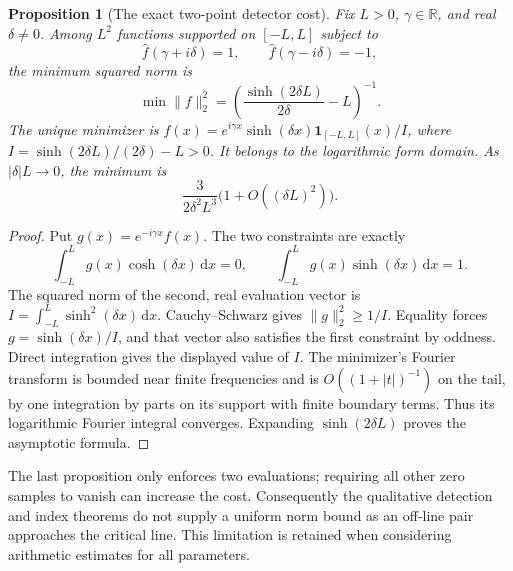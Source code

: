 \documentclass[11pt]{article}
\newtheorem{proposition}[theorem]{Proposition}
\theoremstyle{remark}\newtheorem{remark}[theorem]{Remark}
\newcommand{\R}{\mathbb R}
\newcommand{\dd}{\,\mathrm d}
\begin{document}
\begin{proposition}[The exact two-point detector cost]
\label{prop:two-point-cost}
Fix $L>0$, $\gamma\in\R$, and real $\delta\ne0$.
Among $L^2$ functions supported on $[-L,L]$ subject to
\[
 \widehat f(\gamma+i\delta)=1,\qquad
                       \widehat f(\gamma-i\delta)=-1,
\]
the minimum squared norm is
\[
 \min\|f\|_2^2=
 \left(\frac{\sinh(2\delta L)}{2\delta}-L\right)^{-1}.
                                                               \tag{DC}
\]
The unique minimizer is
$f(x)=e^{i\gamma x}\sinh(\delta x)\mathbf1_{[-L,L]}(x)/I$,
where $I=\sinh(2\delta L)/(2\delta)-L>0$.
It belongs to the logarithmic form domain. As $|\delta|L\to0$,
the minimum is
\[
 \frac{3}{2\delta^2L^3}\bigl(1+O((\delta L)^2)\bigr).
\]
\end{proposition}
\begin{proof}
Put $g(x)=e^{-i\gamma x}f(x)$.
The two constraints are exactly
\[
 \int_{-L}^L g(x)\cosh(\delta x)\dd x=0,
 \qquad \int_{-L}^L g(x)\sinh(\delta x)\dd x=1.
\]
The squared norm of the second, real evaluation vector is
$I=\int_{-L}^L\sinh^2(\delta x)\dd x$.
Cauchy--Schwarz gives $\|g\|_2^2\ge1/I$.
Equality forces $g=\sinh(\delta x)/I$, and that vector
also satisfies the first constraint by oddness.
Direct integration gives the displayed value of $I$.
The minimizer's Fourier transform is bounded near finite
frequencies and is $O((1+|t|)^{-1})$ on the tail, by one
integration by parts on its support with finite boundary terms.
Thus its logarithmic Fourier integral converges.
Expanding $\sinh(2\delta L)$ proves the asymptotic formula.
\end{proof}

The last proposition only enforces two evaluations; requiring
all other zero samples to vanish can increase the cost.
Consequently the qualitative detection and index theorems
do not supply a uniform norm bound as an off-line pair
approaches the critical line. This limitation is retained
when considering arithmetic estimates for all parameters.
\end{document}
